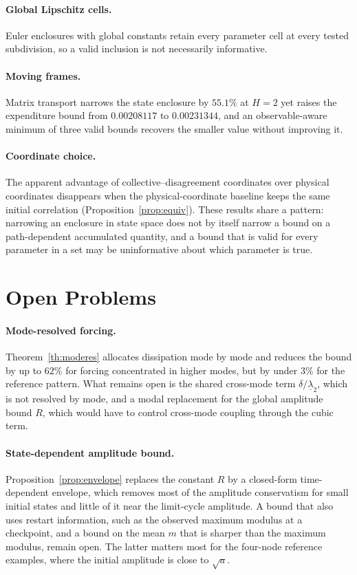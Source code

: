 \documentclass[11pt,notitlepage]{report}
\theoremstyle{definition}
\theoremstyle{remark}
\begin{document}
\paragraph{Global Lipschitz cells.} Euler enclosures with global constants retain every parameter cell at every tested subdivision, so a valid inclusion is not necessarily informative.
\paragraph{Moving frames.} Matrix transport narrows the state enclosure by $55.1\%$ at $H=2$ yet raises the expenditure bound from $0.00208117$ to $0.00231344$, and an observable-aware minimum of three valid bounds recovers the smaller value without improving it.
\paragraph{Coordinate choice.} The apparent advantage of collective--disagreement coordinates over physical coordinates disappears when the physical-coordinate baseline keeps the same initial correlation (Proposition~\ref{prop:equiv}).
These results share a pattern: narrowing an enclosure in state space does not by itself narrow a bound on a path-dependent accumulated quantity, and a bound that is valid for every parameter in a set may be uninformative about which parameter is true.

\section{Open Problems}
\paragraph{Mode-resolved forcing.} Theorem~\ref{th:moderes} allocates dissipation mode by mode and reduces the bound by up to $62\%$ for forcing concentrated in higher modes, but by under $3\%$ for the reference pattern. What remains open is the shared cross-mode term $\delta/\underline\lambda_2$, which is not resolved by mode, and a modal replacement for the global amplitude bound $R$, which would have to control cross-mode coupling through the cubic term.

\paragraph{State-dependent amplitude bound.} Proposition~\ref{prop:envelope} replaces the constant $R$ by a closed-form time-dependent envelope, which removes most of the amplitude conservatism for small initial states and little of it near the limit-cycle amplitude. A bound that also uses restart information, such as the observed maximum modulus at a checkpoint, and a bound on the mean $m$ that is sharper than the maximum modulus, remain open. The latter matters most for the four-node reference examples, where the initial amplitude is close to $\sqrt a$.
\end{document}
